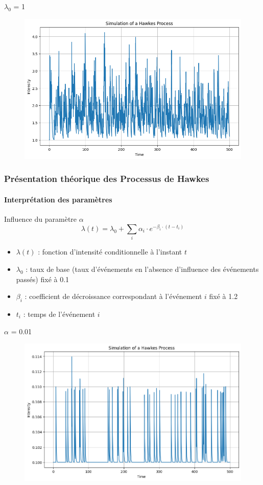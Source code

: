 \begin{frame}
    \begin{block}{$\lambda_0$ = 1}
    \begin{figure}[h]
        \centering
        \includegraphics[width=0.6\linewidth]{figures/lambda3.png}
    \end{figure}
    \end{block}
\end{frame}

\begin{frame}
    \frametitle{Présentation théorique des Processus de Hawkes}
    \framesubtitle{Interprétation des paramètres}

    \begin{block}{Influence du paramètre $\alpha$ }
    \[ \lambda(t) = \lambda_0 + \sum_i \alpha_i \cdot e^{-\beta_i \cdot (t - t_i)} \]

    \begin{itemize}
            \item $\lambda(t)$ : fonction d'intensité conditionnelle à l'instant $t$
            \item $\lambda_0$ : taux de base (taux d'événements en l'absence d'influence des événements passés) fixé à 0.1
            \item $\beta_i$ : coefficient de décroissance correspondant à l'événement $i$ fixé à 1.2
            \item $t_i$ : temps de l'événement $i$
        \end{itemize}

    \end{block}
\end{frame}
\begin{frame}
    \begin{block}{$\alpha$ = 0.01}
    \begin{figure}[h]
        \centering
        \includegraphics[width=0.6\linewidth]{figures/alpha1.png}
    \end{figure}
    \end{block}
\end{frame}

